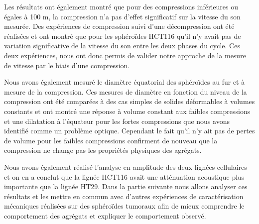 Les résultats ont également montré que pour des compressions inférieures ou égales à 100 \textmu m, la compression n'a pas d'effet significatif sur la vitesse du son mesurée. Des expériences de compression suivi d'une décompression ont été réalisées et ont montré que pour les sphéroïdes HCT116 qu'il n'y avait pas de variation significative de la vitesse du son entre les deux phases du cycle. Ces deux expériences, nous ont donc permis de valider notre approche de la mesure de vitesse par le biais d'une compression.

 Nous avons également mesuré le diamètre équatorial des sphéroïdes au fur et à mesure de la compression. Ces mesures de diamètre en fonction du niveau de la compression ont été comparées à des cas simples de solides déformables à volumes constants et ont montré une réponse à volume constant aux faibles compressions et une dilatation à l'équateur pour les fortes compressions que nous avons identifié comme un problème optique. Cependant le fait qu'il n'y ait pas de pertes de volume pour les faibles compressions confirment de nouveau que la compression ne change pas les propriétés physiques des agrégats.

Nous avons également réalisé l'analyse en amplitude des deux lignées cellulaires et on en a conclut que la lignée HCT116 avait une  atténuation acoustique plus importante que la  lignée HT29.  Dans la partie suivante nous allons analyser ces résultats et les mettre en commun avec d'autres expériences de caractérisation mécaniques réalisées sur des sphéroïdes tumoraux afin de mieux comprendre le comportement des agrégats et  expliquer le comportement observé.


